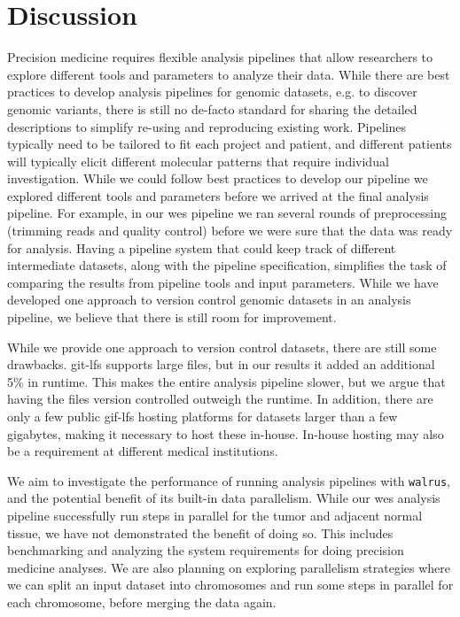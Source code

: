\section{Discussion}
Precision medicine requires flexible analysis pipelines that allow researchers
to explore different tools and parameters to analyze their data.  While there
are best practices to develop analysis pipelines for genomic datasets, e.g. to
discover genomic variants, there is still no de-facto standard for sharing the
detailed descriptions to simplify re-using and reproducing existing work.
Pipelines typically need to be tailored to fit each project and patient, and
different patients will typically elicit different molecular patterns that
require individual investigation. While we could follow best practices to
develop our pipeline we explored different tools and parameters before we
arrived at the final analysis pipeline.  For example, in our \gls{wes} pipeline
we ran several rounds of preprocessing (trimming reads and quality control)
before we were sure that the data was ready for analysis. Having a pipeline
system that could keep track of different intermediate datasets, along with the
pipeline specification, simplifies the task of comparing the results from
pipeline tools and input parameters. While we have developed one approach to
version control genomic datasets in an analysis pipeline, we believe that there
is still room for improvement. 

While we provide one approach to version control datasets, there are still some
drawbacks. git-lfs supports large files, but in our results it added an
additional 5\% in runtime.  This makes the entire analysis pipeline slower, but
we argue that having the files version controlled outweigh the runtime. In
addition, there are only a few public gif-lfs hosting platforms for datasets
larger than a few gigabytes, making it necessary to host these in-house.
In-house hosting may also be a requirement at different medical institutions.  

We aim to investigate the performance of running analysis pipelines with
\texttt{walrus}, and the potential benefit of its built-in data parallelism.
While our \gls{wes} analysis pipeline successfully run steps in parallel for the
tumor and adjacent normal tissue, we have not demonstrated the benefit
of doing so. This includes benchmarking and analyzing the system requirements
for doing precision medicine analyses.  We are also planning on exploring
parallelism strategies where we can split an input dataset into chromosomes and
run some steps in parallel for each chromosome, before merging the data again. 

